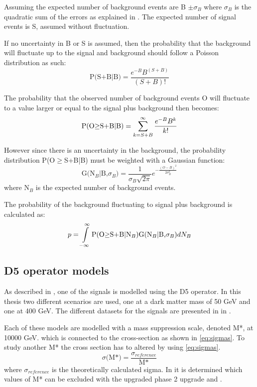Assuming the expected number of background events are B $\pm \sigma_B$ where $\sigma_B$ is the quadratic sum of the errors as explained in . The expected number of signal events is S, assumed without fluctuation. 

If no uncertainty in B or S is assumed, then the probability that the background will fluctuate up to the signal and background should follow a Poisson distribution as such:
\begin{equation}
\text{P(S+B|B)}=\frac{e^{-B}B^{(S+B)}}{(S+B)!}
\end{equation} 

The probability that the observed number of background events O will fluctuate to a value larger or equal to the signal plus background then becomes:
\begin{equation}
\text{P(O$ \geq$S+B|B)} =\sum_{k=S+B}^{\infty}  \frac{e^{-B}B^k}{k!}
\end{equation} 

However since there is an uncertainty in the background, the probability distribution P(O$ \geq$S+B|B) must be weighted with a Gaussian function:
\begin{equation}
 \text{G(N$_B$|B,$\sigma_B$)}=\frac{1}{\sigma_B \sqrt{2 \pi}} e^{-\frac{(O-B)^2}{2\sigma_B^2}}
\end{equation}
where N$_B$ is the expected number of background events. 

The probability of the background fluctuating to signal plus background is calculated as:
\begin{equation}
p = \int\limits_{-\infty}^{\infty} \text{P(O$ \geq$S+B|N$_B$)G(N$_B$|B,$\sigma_B$)} dN_B
\end{equation}

\subsection{D5 operator models}\label{sec:signal:subsec:d5}
As described in , one of the signals is modelled using the D5 operator. In this thesis two different scenarios are used, one at a dark matter mass of 50 GeV and one at 400 GeV. The different datasets for the signals are presented in  in .

Each of these models are modelled with a mass suppression scale, denoted M*, at 10000 GeV. which is connected to the cross-section as shown in \eqref{eq:sigmas}. To study another M* the cross section has to altered by using \eqref{eq:sigmas}.
\begin{equation}\label{eq:sigmas}
\sigma \text{(M*)} = \frac{\sigma_{reference}}{\text{M*}} 
\end{equation}
where $\sigma_{reference}$ is the theoretically calculated sigma.
In  it is determined which values of M* can be excluded with the upgraded \abbrLHC phase 2 upgrade and \abbrATLAS .

